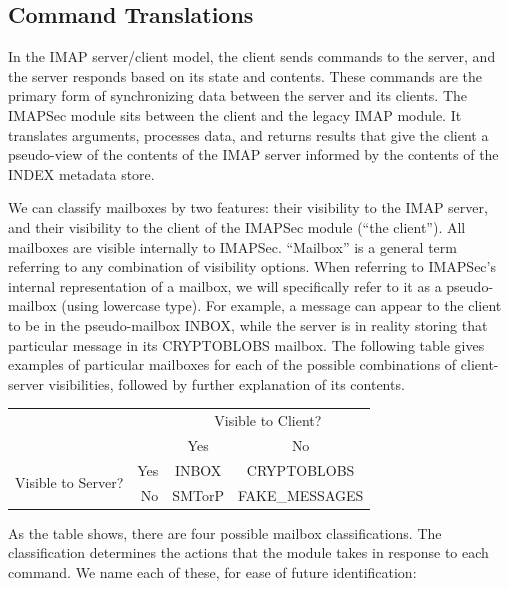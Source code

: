 \documentclass[pageno]{jpaper}
\newcommand{\project}{IMAPSec }
\newcommand{\projectnospace}{IMAPSec}
\begin{document}
\subsection{Command Translations}
In the IMAP server/client model, the client sends commands to the server, and the server responds based on its state and contents. These commands are the primary form of synchronizing data between the server and its clients. The \project module sits between the client and the legacy IMAP module. It translates arguments, processes data, and returns results that give the client a pseudo-view of the contents of the IMAP server informed by the contents of the INDEX metadata store.

We can classify mailboxes by two features: their visibility to the IMAP server, and their visibility to the client of the \project module (``the client''). All mailboxes are visible internally to \projectnospace. ``Mailbox'' is a general term referring to any combination of visibility options. When referring to \projectnospace's internal representation of a mailbox, we will specifically refer to it as a pseudo-mailbox (using lowercase type). For example, a message can appear to the client to be in the pseudo-mailbox INBOX, while the server is in reality storing that particular message in its CRYPTOBLOBS mailbox. The following table gives examples of particular mailboxes for each of the possible combinations of client-server visibilities, followed by further explanation of its contents.

\begin{center}
\begin{tabular}{ rr|c|c| }

 &\multicolumn{1}{r}{} & \multicolumn{2}{c}{Visible to Client?} \\

&\multicolumn{1}{r}{}
 &  \multicolumn{1}{c}{Yes}
 & \multicolumn{1}{c}{No} \\
\cline{3-4}
\multirow{2}{*}{Visible to Server?} & Yes & INBOX & CRYPTOBLOBS \\
\cline{3-4}
& No & SMTorP & FAKE\_MESSAGES \\
\cline{3-4}
\end{tabular}
\end{center}

\medskip

As the table shows, there are four possible mailbox classifications. The classification determines the actions that the module takes in response to each command. We name each of these, for ease of future identification:
\end{document}
